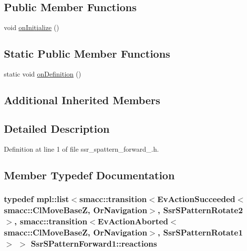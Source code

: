 \subsection*{Public Member Functions}
\begin{DoxyCompactItemize}
\item 
void \hyperlink{structSsrSPatternForward1_a4dcbd54092d60be69442ff7009a9b774}{on\+Initialize} ()
\end{DoxyCompactItemize}
\subsection*{Static Public Member Functions}
\begin{DoxyCompactItemize}
\item 
static void \hyperlink{structSsrSPatternForward1_a2e6358624ff796d27f68636609e2ce3d}{on\+Definition} ()
\end{DoxyCompactItemize}
\subsection*{Additional Inherited Members}


\subsection{Detailed Description}


Definition at line 1 of file ssr\+\_\+spattern\+\_\+forward\+\_.\+h.



\subsection{Member Typedef Documentation}
\subsubsection[{\texorpdfstring{reactions}{reactions}}]{\setlength{\rightskip}{0pt plus 5cm}typedef mpl\+::list$<${\bf smacc\+::transition}$<$Ev\+Action\+Succeeded$<${\bf smacc\+::\+Cl\+Move\+BaseZ}, Or\+Navigation$>$, {\bf Ssr\+S\+Pattern\+Rotate2}$>$, {\bf smacc\+::transition}$<$Ev\+Action\+Aborted$<${\bf smacc\+::\+Cl\+Move\+BaseZ}, Or\+Navigation$>$, {\bf Ssr\+S\+Pattern\+Rotate1}$>$ $>$ {\bf Ssr\+S\+Pattern\+Forward1\+::reactions}}\hypertarget{structSsrSPatternForward1_a78e21524356c8c071893bf7e41a98558}{}\label{structSsrSPatternForward1_a78e21524356c8c071893bf7e41a98558}


